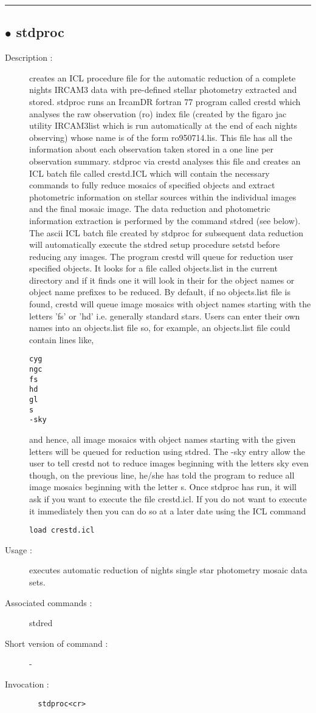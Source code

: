 \hrule \subsection*{$\bullet$ stdproc}
\begin{description}
\item[Description :] creates an ICL procedure file for the automatic reduction of a
complete nights {\sc IRCAM3} data with pre-defined stellar photometry extracted
and stored.  stdproc runs an IrcamDR fortran 77 program called crestd
which analyses the raw observation (ro) index file (created by the figaro
jac utility {\sc IRCAM3}list which is run automatically at the end of each
nights observing) whose name is of the form ro950714.lis.  This file has
all the information about each observation taken stored in a one line per
observation summary.  stdproc via crestd analyses this file and creates
an ICL batch file called crestd.ICL which will contain the necessary
commands to fully reduce mosaics of specified objects and extract
photometric information on stellar sources within the individual images
and the final mosaic image.  The data reduction and photometric
information extraction is performed by the command stdred (see below).
The ascii ICL batch file created by stdproc for subsequent data reduction
will automatically execute the stdred setup procedure setstd before
reducing any images.  The program crestd will queue for reduction user
specified objects.  It looks for a file called objects.list in the current
directory and if it finds one it will look in their for the object names
or object name prefixes to be reduced.  By default, if no objects.list
file is found, crestd will queue image mosaics with object names starting
with the letters 'fs' or 'hd' i.e. generally standard stars.  Users can
enter their own names into an objects.list file so, for example, an
objects.list file could contain lines like,
\begin{verbatim}
cyg
ngc
fs
hd
gl
s
-sky
\end{verbatim}
and hence, all image mosaics with object names starting with the given
letters will be queued for reduction using stdred.  The -sky entry allow
the user to tell crestd not to reduce images beginning with the letters
sky even though, on the previous line, he/she has told the program to
reduce all image mosaics beginning with the letter s.  Once stdproc has
run, it will ask if you want to execute the file crestd.icl.   If you do
not want to execute it immediately then you can do so at a later date
using the ICL command 
\begin{verbatim}
load crestd.icl
\end{verbatim}
\item[Usage :] executes automatic reduction of nights single star photometry
mosaic data sets.
\item[Associated commands :] stdred
\item[Short version of command :] -
\item[Invocation :]

\verb+  stdproc<cr> +
\end{description}

